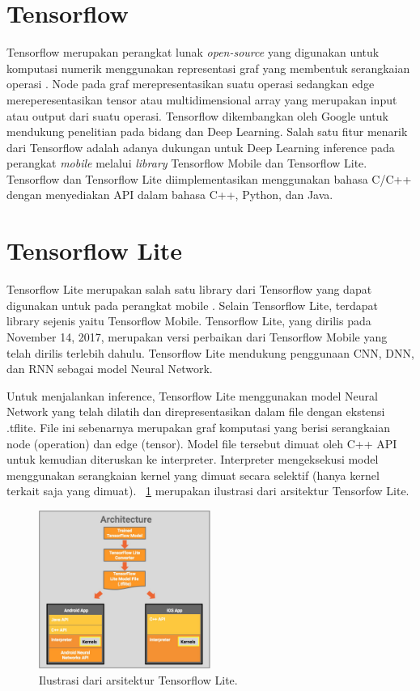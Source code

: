 \section{Tensorflow}
Tensorflow merupakan perangkat lunak \textit{open-source} yang digunakan untuk komputasi numerik menggunakan representasi graf yang membentuk serangkaian operasi \cite{tensorflow}. Node pada graf merepresentasikan suatu operasi sedangkan edge mereperesentasikan tensor atau multidimensional array yang merupakan input atau output dari suatu operasi. Tensorflow dikembangkan oleh Google untuk mendukung penelitian pada bidang \ml dan Deep Learning. Salah satu fitur menarik dari Tensorflow adalah adanya dukungan untuk Deep Learning inference pada perangkat \textit{mobile} melalui \textit{library} Tensorflow Mobile dan Tensorflow Lite. Tensorflow dan Tensorflow Lite diimplementasikan menggunakan bahasa C/C++ dengan menyediakan API dalam bahasa C++, Python, dan Java.

\section{Tensorflow Lite}
Tensorflow Lite merupakan salah satu library dari Tensorflow yang dapat digunakan untuk \deeplearning \inference pada perangkat mobile \cite{tflite}. Selain Tensorflow Lite, terdapat library sejenis yaitu Tensorflow Mobile. Tensorflow Lite, yang dirilis pada November 14, 2017, merupakan versi perbaikan dari Tensorflow Mobile yang telah dirilis terlebih dahulu. Tensorflow Lite mendukung penggunaan CNN, DNN, dan RNN sebagai model Neural Network. 

Untuk menjalankan inference, Tensorflow Lite menggunakan model Neural Network yang telah dilatih dan direpresentasikan dalam file dengan ekstensi .tflite. File ini sebenarnya merupakan graf komputasi yang berisi serangkaian node (operation) dan edge (tensor). Model file tersebut dimuat oleh C++ API untuk kemudian diteruskan ke interpreter. Interpreter mengeksekusi model menggunakan serangkaian kernel yang dimuat secara selektif (hanya kernel terkait saja yang dimuat). \pic~\ref{fig:tflite} merupakan ilustrasi dari arsitektur Tensorfow Lite.

\begin{figure}
	\centering
	\includegraphics[width=0.50\textwidth]
	{pics/tflite.jpg}
	\caption{Ilustrasi dari arsitektur Tensorflow Lite.}
	\label{fig:tflite}
\end{figure}

